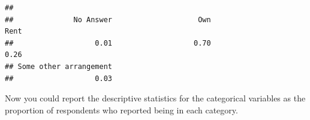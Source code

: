 \documentclass[]{article}
\begin{document}
\begin{verbatim}
## 
##              No Answer                    Own                   Rent 
##                   0.01                   0.70                   0.26 
## Some other arrangement 
##                   0.03
\end{verbatim}

Now you could report the descriptive statistics for the categorical
variables as the proportion of respondents who reported being in each
category.
\end{document}
